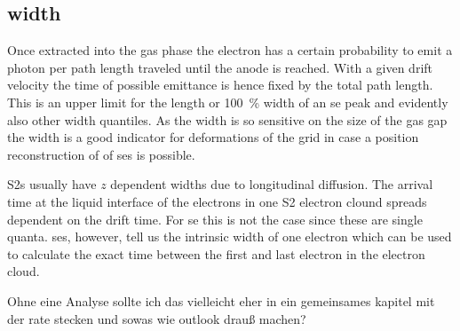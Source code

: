 
\FloatBarrier
\subsection{width}
\label{ssec:width}
\FloatBarrier


Once extracted into the gas phase the electron has a certain probability to emit a photon per path length traveled until the anode is reached. %
With a given drift velocity the time of possible emittance is hence fixed by the total path length.
This is an upper limit for the length or \SI{100}{\%} width of an \gls{se} peak and evidently also other width quantiles.
As the width is so sensitive on the size of the gas gap the width is a good indicator for deformations of the grid in case a position reconstruction of of \gls{se}s is possible.

S2s usually have $ z $ dependent widths due to longitudinal diffusion.
The arrival time at the liquid interface of the electrons in one S2 electron clound spreads dependent on the drift time.
For \gls{se} this is not the case since these are single quanta.
\gls{se}s, however, tell us the intrinsic width of one electron which can be used to calculate the exact time between the first and last electron in the electron cloud.


Ohne eine Analyse sollte ich das vielleicht eher in ein gemeinsames kapitel mit der rate stecken und sowas wie outlook drauß machen?









